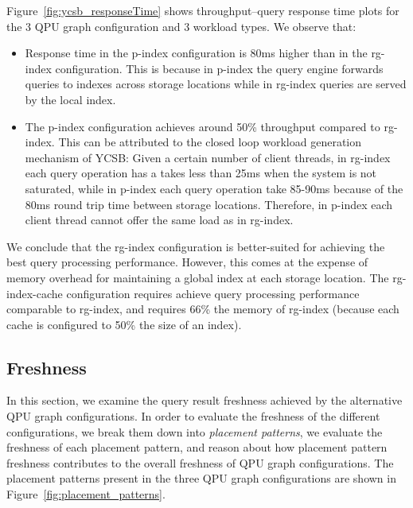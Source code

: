 Figure~\ref{fig:ycsb_responseTime} shows throughput--query response time plots for the 3 QPU graph configuration and 3 workload
types.
We observe that:
\begin{itemize}
  \item Response time in the p-index configuration is 80ms higher than in the rg-index configuration.
  This is because in p-index the query engine forwards queries to indexes across storage locations while
  in rg-index queries are served by the local index.
  \item The p-index configuration achieves around 50\% throughput compared to rg-index.
  This can be attributed to the closed loop workload generation mechanism of YCSB:
  Given a certain number of client threads, in rg-index each query operation has a takes less than 25ms
  when the system is not saturated, while in p-index each query operation take 85-90ms because of the 80ms
  round trip time between storage locations.
  Therefore, in p-index each client thread cannot offer the same load as in rg-index.
\end{itemize}

We conclude that the rg-index configuration is better-suited for achieving the best query processing performance.
However, this comes at the expense of memory overhead for maintaining a global index at each storage location.
The rg-index-cache configuration requires achieve query processing performance comparable to rg-index,
and requires 66\% the memory of rg-index (because each cache is configured to 50\% the size of an index).

\subsection{Freshness}

In this section, we examine the query result freshness achieved by the alternative QPU graph configurations.
In order to evaluate the freshness of the different configurations,
we break them down into \textit{placement patterns}, we evaluate the freshness of each placement pattern,
and reason about how placement pattern freshness contributes to the overall freshness of QPU graph configurations.
The placement patterns present in the three QPU graph configurations are shown in Figure~\ref{fig:placement_patterns}.

